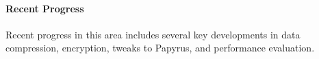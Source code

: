 \paragraph{Recent Progress}
Recent progress in this area includes several key developments in data compression, encryption, tweaks to Papyrus, and performance evaluation.

%


